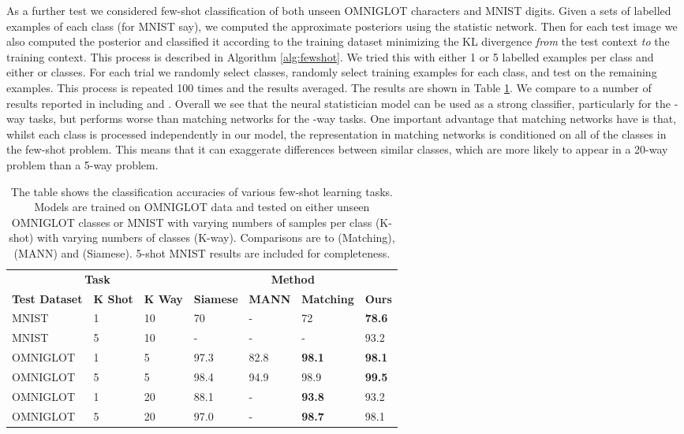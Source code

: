 \documentclass{article} \usepackage{iclr2017_conference,times}
\begin{document}
As a further test we considered few-shot classification of both unseen OMNIGLOT characters and MNIST digits. Given a sets of labelled examples of each class  (for MNIST say), we computed the approximate posteriors  using the statistic network. Then for each test image  we also computed the posterior  and classified it according to the training dataset  minimizing the KL divergence \emph{from} the test context \emph{to} the training context. This process is described in Algorithm \ref{alg:fewshot}. We tried this with either 1 or 5 labelled examples per class and either  or  classes. For each trial we randomly select  classes, randomly select training examples for each class, and test on the remaining examples. This process is repeated 100 times and the results averaged. The results are shown in Table \ref{table:small_shot_classification}. We compare to a number of results reported in \citet{matching} including \citet{mann}  and \citet{siamese_one_shot}. Overall we see that the neural statistician model can be used as a strong classifier, particularly for the -way tasks, but performs worse than matching networks for the -way tasks. One important advantage that matching networks have is that, whilst each class is processed independently in our model, the representation in matching networks is conditioned on all of the classes in the few-shot problem. This means that it can exaggerate differences between similar classes, which are more likely to appear in a 20-way problem than a 5-way problem.
\vspace{-1em}
\begin{table}[!hb]
    \centering
    \begin{tabular}{  l  l  l |  l l l l}
    \multicolumn{3}{c|}{\bf{Task}} & \multicolumn{4}{c}{\bf{Method}} \\
\bf{Test Dataset} & \bf{K Shot} & \bf{K Way}  &\bf{Siamese} & \bf{MANN} & \bf{Matching} & \bf{Ours}  \\ \hline
    MNIST    & 1  & 10  & 70   & -    & 72   & \bf{78.6} \\ 
    MNIST    & 5  & 10  & -    & -    &  -   & 93.2 \\ 
    OMNIGLOT & 1  & 5   & 97.3 & 82.8 & \bf{98.1} & \bf{98.1} \\ 
    OMNIGLOT & 5  & 5   & 98.4 & 94.9 & 98.9 & \bf{99.5} \\ 
    OMNIGLOT & 1  & 20  & 88.1 & -    & \bf{93.8} & 93.2 \\  
    OMNIGLOT & 5  & 20  & 97.0 & -    & \bf{98.7} & 98.1 \\
    \end{tabular}
\caption{The table shows the classification accuracies of various few-shot learning tasks. Models are trained on OMNIGLOT data and tested on either unseen OMNIGLOT classes or MNIST with varying numbers of samples per class (K-shot) with varying numbers of classes (K-way). Comparisons are to \cite{matching} (Matching), \cite{mann} (MANN) and \cite{siamese_one_shot} (Siamese). 5-shot MNIST results are included for completeness.}
\label{table:small_shot_classification}
\end{table}
\end{document}
